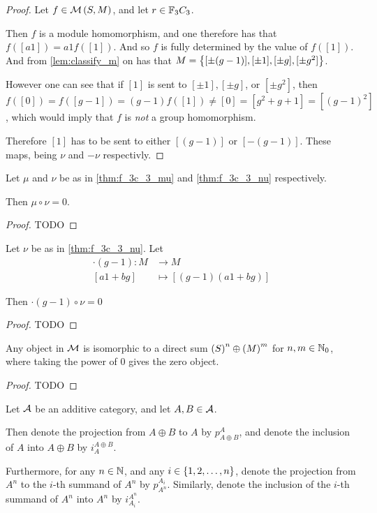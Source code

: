 \begin{proof}
    Let \( f \in {\mathcal{M}}\left( S, M \right) \), and let \( r \in {\mathbb{F}}_3C_3 \).
    
    Then \( f \) is a module homomorphism, and one therefore has that \( f([a1]) = a1 f([1]) \). And so \( f \) is fully determined by the value of \( f([1]) \). And from \autoref{lem:classify_m} on has that \( M = \left\{ [\pm (g - 1)], [\pm 1], [\pm g], [\pm g^2] \right\} \). \sloppy

    However one can see that if \( [1] \) is sent to \( [\pm 1], [\pm g] \), or \( [\pm g^2] \), then \( f([0]) = f([g - 1]) = (g - 1)f([1]) \neq [0] = [g^2 + g + 1] = [(g - 1)^2] \), which would imply that \( f \) is \emph{not} a group homomorphism.

    Therefore \( [1] \) has to be sent to either \( [(g - 1)] \) or \( [-(g - 1)] \). These maps, being \( \nu \) and \( -\nu \) respectivly.
\end{proof}

\begin{lemma} \label{thm:f_3c_3_mu_circ_nu_zero}
    Let \( \mu \) and \( \nu \) be as in \autoref{thm:f_3c_3_mu} and \autoref{thm:f_3c_3_nu} respectively.

    Then \( \mu \circ \nu = 0 \).
\end{lemma}
\begin{proof}
    TODO
\end{proof}

\begin{lemma} \label{lem:g-1_circ_nu_equals_zero}
    Let \( \nu \) be as in \autoref{thm:f_3c_3_nu}. Let
    \begin{align*}
        \cdot(g - 1): M &\to M \\
        [a1 + bg] &\mapsto [(g - 1)(a1 + bg)]
    \end{align*}

    Then \( \cdot(g - 1) \circ \nu = 0 \) 
\end{lemma}
\begin{proof}
    TODO
\end{proof}

\begin{lemma} \label{thm:f_3c_3_decomposition}
    Any object in \( {\mathcal{M}} \) is isomorphic to a direct sum \( \left(  S  \right)^n \oplus \left(  M  \right)^m \) for \( n, m \in {\mathbb{N}}_0 \), where taking the power of \( 0 \) gives the zero object. \sloppy
\end{lemma}
\begin{proof}
    TODO
\end{proof}

\begin{notation}
    Let \( {\mathcal{A}} \) be an additive category, and let \( A, B \in {\mathcal{A}} \).

    Then denote the projection from \( A \oplus B \) to \( A \) by \( p_{A \oplus B}^A \), and denote the inclusion of \( A \) into \( A \oplus B \) by \( i_A^{A \oplus B} \).

    Furthermore, for any \( n \in {\mathbb{N}} \), and any \( i \in \left\{ 1, 2, \dots, n \right\} \), denote the projection from \( A^n \) to the \( i \)-th summand of \( A^n \) by \( p_{A^n}^{A_i} \). Similarly, denote the inclusion of the \( i \)-th summand of \( A^n \) into \( A^n \) by \( i_{A_i}^{A^n} \).
\end{notation}

